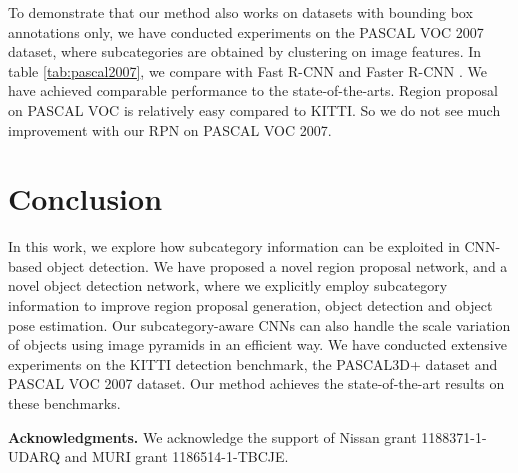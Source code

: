 \documentclass[10pt,twocolumn,letterpaper]{article}
\begin{document}
To demonstrate that our method also works on datasets with bounding box annotations only, we have conducted experiments on the PASCAL VOC 2007 dataset, where subcategories are obtained by clustering on image features. In table \ref{tab:pascal2007}, we compare with Fast R-CNN \cite{girshick2015fast} and Faster R-CNN \cite{ren2015faster}. We have achieved comparable performance to the state-of-the-arts. Region proposal on PASCAL VOC is relatively easy compared to KITTI. So we do not see much improvement with our RPN on PASCAL VOC 2007.

\section{Conclusion}

In this work, we explore how subcategory information can be exploited in CNN-based object detection. We have proposed a novel region proposal network, and a novel object detection network, where we explicitly employ subcategory information to improve region proposal generation, object detection and object pose estimation. Our subcategory-aware CNNs can also handle the scale variation of objects using image pyramids in an efficient way. We have conducted extensive experiments on the KITTI detection benchmark, the PASCAL3D+ dataset and PASCAL VOC 2007 dataset. Our method achieves the state-of-the-art results on these benchmarks.

\noindent \textbf{Acknowledgments.} We acknowledge the support of Nissan grant 1188371-1-UDARQ and MURI grant 1186514-1-TBCJE.


{\small
	
	
}
\end{document}
